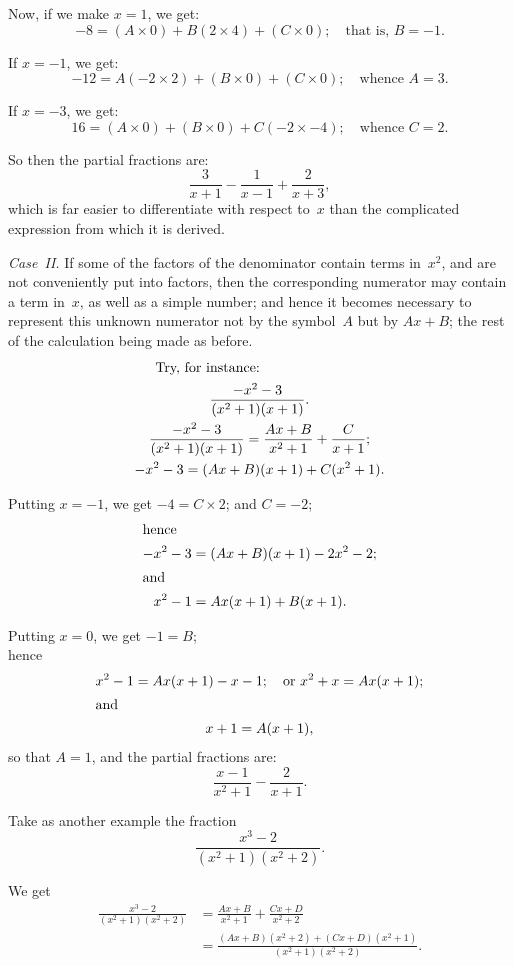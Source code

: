 \documentclass[12pt]{book}[2005/09/16]
\newcommand{\Paragraph}[1]{\medskip\pagebreak[1]\par\textit{#1}}
\newcommand{\DPPageSep}[2]{\Pagelabel{#2}}
\newcommand{\Pagelabel}[1]
  {\phantomsection\label{#1}}
\begin{document}
Now, if we make $x=1$, we get:
\[
-8 = (A × 0) + B(2 × 4) + (C × 0);\quad \text{that is, } B = -1.
\]

If $x= -1$, we get:
\[
-12 = A(-2 × 2) + (B × 0) + (C × 0);\quad \text{whence } A = 3.
\]
\DPPageSep{137.png}{125}%

If $x = -3$, we get:
\[
16 = (A × 0) + (B × 0) + C(-2 × -4);\quad \text{whence } C = 2.
\]

So then the partial fractions are:
\[
\frac{3}{x+1} - \frac{1}{x-1} + \frac{2}{x+3},
\]
which is far easier to differentiate with respect to~$x$
than the complicated expression from which it is
derived.

\Paragraph{Case~II\@.} If some of the factors of the denominator
contain terms in~$x^2$, and are not conveniently put
into factors, then the corresponding numerator may
contain a term in~$x$, as well as a simple number; and
hence it becomes necessary to represent this unknown
numerator not by the symbol~$A$ but by $Ax + B$; the
rest of the calculation being made as before.
%
\begin{gather*}
\intertext{\rlap{\indent Try, for instance:}}
\frac{-x^2 - 3}{(x^2+1)(x+1)}. \\
\frac{-x^2 - 3}{(x^2+1)(x+1)} = \frac{Ax+B}{x^2+1} + \frac{C}{x+1};\\
-x^2 - 3 = (Ax + B)(x+1) + C(x^2+1).
\end{gather*}

Putting $x= -1$, we get $-4 = C × 2$; and $C = -2$;
\begin{align*}
\intertext{hence}
-x^2 - 3 &= (Ax + B)(x + 1) - 2x^2 - 2; \\
\intertext{and}
x^2 - 1 &= Ax(x+1) + B(x+1).
\end{align*}

Putting $x = 0$, we get $-1 = B$; \\
hence
\begin{gather*}
x^2 - 1 = Ax(x + 1) - x - 1;\quad \text{or } x^2 + x = Ax(x+1); \\
\intertext{and}
x+1 = A(x+1),
\end{gather*}
\DPPageSep{138.png}{126}%
so that $A=1$, and the partial fractions are:
\[
\frac{x-1}{x^2+1} - \frac{2}{x+1}.
\]

Take as another example the fraction
\[
\frac{x^3-2}{(x^2+1)(x^2+2)}.
\]

We get
\begin{align*}
\frac{x^3-2}{(x^2+1)(x^2+2)}
  &= \frac{Ax+B}{x^2+1} + \frac{Cx+D}{x^2+2}\\
  &= \frac{(Ax+B)(x^2+2)+(Cx+D)(x^2+1)}{(x^2+1)(x^2+2)}.
\end{align*}
\end{document}
